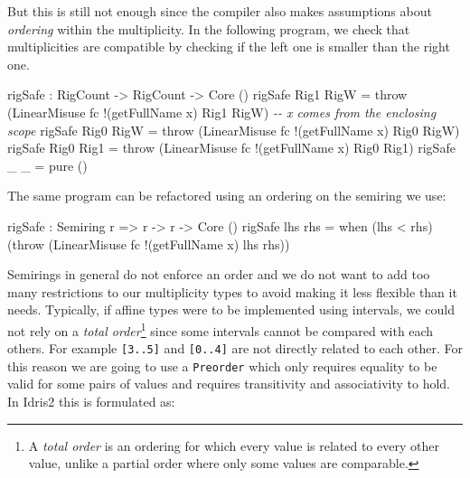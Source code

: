 \documentclass[
]{article}
\newenvironment{Shaded}{}{}
\newcommand{\CommentTok}[1]{\textcolor[rgb]{0.38,0.63,0.69}{\textit{#1}}}
\newcommand{\DataTypeTok}[1]{\textcolor[rgb]{0.56,0.13,0.00}{#1}}
\newcommand{\FunctionTok}[1]{\textcolor[rgb]{0.02,0.16,0.49}{#1}}
\newcommand{\NormalTok}[1]{#1}
\newcommand{\OperatorTok}[1]{\textcolor[rgb]{0.40,0.40,0.40}{#1}}
\newcommand{\OtherTok}[1]{\textcolor[rgb]{0.00,0.44,0.13}{#1}}
\begin{document}
But this is still not enough since the compiler also makes assumptions
about \emph{ordering} within the multiplicity. In the following program,
we check that multiplicities are compatible by checking if the left one
is smaller than the right one.

\begin{Shaded}
\begin{Highlighting}[]

\NormalTok{rigSafe }\OperatorTok{:} \DataTypeTok{RigCount} \OtherTok{{-}\textgreater{}} \DataTypeTok{RigCount} \OtherTok{{-}\textgreater{}} \DataTypeTok{Core}\NormalTok{ ()}
\NormalTok{  rigSafe }\DataTypeTok{Rig1} \DataTypeTok{RigW} \OtherTok{=}\NormalTok{ throw }
\NormalTok{    (}\DataTypeTok{LinearMisuse}\NormalTok{ fc }\OperatorTok{!}\NormalTok{(getFullName x) }\DataTypeTok{Rig1} \DataTypeTok{RigW}\NormalTok{)}
    \CommentTok{{-}{-} \textasciigrave{}x\textasciigrave{} comes from the enclosing scope}
\NormalTok{rigSafe }\DataTypeTok{Rig0} \DataTypeTok{RigW} \OtherTok{=}\NormalTok{ throw}
\NormalTok{    (}\DataTypeTok{LinearMisuse}\NormalTok{ fc }\OperatorTok{!}\NormalTok{(getFullName x) }\DataTypeTok{Rig0} \DataTypeTok{RigW}\NormalTok{)}
\NormalTok{rigSafe }\DataTypeTok{Rig0} \DataTypeTok{Rig1} \OtherTok{=}\NormalTok{ throw }
\NormalTok{    (}\DataTypeTok{LinearMisuse}\NormalTok{ fc }\OperatorTok{!}\NormalTok{(getFullName x) }\DataTypeTok{Rig0} \DataTypeTok{Rig1}\NormalTok{)}
\NormalTok{rigSafe \_ \_ }\OtherTok{=} \FunctionTok{pure}\NormalTok{ ()}
\end{Highlighting}
\end{Shaded}

The same program can be refactored using an ordering on the semiring we
use:

\begin{Shaded}
\begin{Highlighting}[]
\NormalTok{rigSafe }\OperatorTok{:} \DataTypeTok{Semiring}\NormalTok{ r }\OtherTok{=\textgreater{}}\NormalTok{ r }\OtherTok{{-}\textgreater{}}\NormalTok{ r }\OtherTok{{-}\textgreater{}} \DataTypeTok{Core}\NormalTok{ ()}
\NormalTok{rigSafe lhs rhs }\OtherTok{=} 
\NormalTok{  when (lhs }\OperatorTok{\textless{}}\NormalTok{ rhs)}
\NormalTok{       (throw (}\DataTypeTok{LinearMisuse}\NormalTok{ fc }\OperatorTok{!}\NormalTok{(getFullName x) lhs rhs))}
\end{Highlighting}
\end{Shaded}

Semirings in general do not enforce an order and we do not want to add
too many restrictions to our multiplicity types to avoid making it less
flexible than it needs. Typically, if affine types were to be
implemented using intervals, we could not rely on a \emph{total
order}\footnote{A \emph{total order} is an ordering for which every
  value is related to every other value, unlike a partial order where
  only some values are comparable.} since some intervals cannot be
compared with each others. For example \texttt{{[}3..5{]}} and
\texttt{{[}0..4{]}} are not directly related to each other. For this
reason we are going to use a \texttt{Preorder} which only requires
equality to be valid for some pairs of values and requires transitivity
and associativity to hold. In Idris2 this is formulated as:
\end{document}
